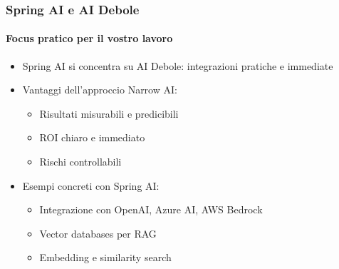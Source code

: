 %
\begin{frame}[t,fragile] \frametitle{Spring AI e AI Debole}
	{\small
		\onslide<1->
		\framesubtitle{Focus pratico per il vostro lavoro}
		\begin{itemize}[leftmargin=10pt,align=right]
			\onslide<2->\item[\alert{\faHandORight}] \alert{Spring AI si concentra su AI Debole:} integrazioni pratiche e immediate
			\onslide<3->\item[\alert{\faHandORight}] \alert{Vantaggi dell'approccio Narrow AI:}
			\begin{itemize}[leftmargin=10pt,align=right]
				\item[\alert{\faHandORight}] Risultati misurabili e predicibili
				\item[\alert{\faHandORight}] ROI chiaro e immediato
				\item[\alert{\faHandORight}] Rischi controllabili
			\end{itemize}
			\item[\alert{\faHandORight}] \alert{Esempi concreti con Spring AI:}
			\begin{itemize}[leftmargin=10pt,align=right]
				\item[\alert{\faHandORight}] Integrazione con OpenAI, Azure AI, AWS Bedrock
				\item[\alert{\faHandORight}] Vector databases per RAG
				\item[\alert{\faHandORight}] Embedding e similarity search
			\end{itemize}
		\end{itemize}
		\vspace*{.3cm}
	}
\end{frame}
